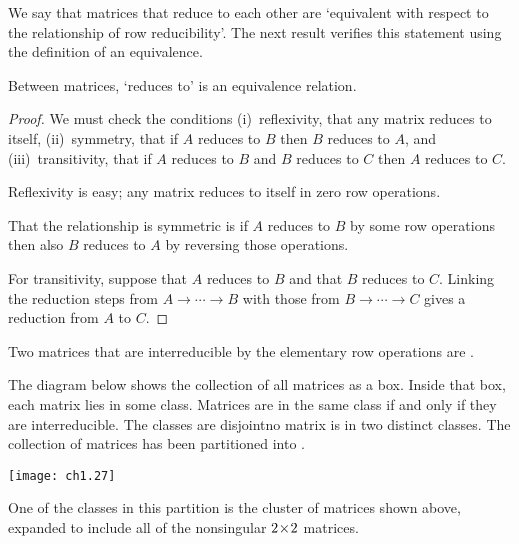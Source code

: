 We say 
that matrices that reduce to each other are `equivalent with respect
to the relationship of row reducibility'.
The next result verifies this statement using the definition of 
an equivalence.

\begin{lemma}
Between matrices, `reduces to' is an equivalence re\-la\-tion.
\end{lemma}

\begin{proof}
We must check the conditions
(i)~reflexivity, that any matrix reduces to itself,
(ii)~symmetry, that if \( A \) reduces to \( B \) then
   \( B \) reduces to \( A \),
and (iii)~transitivity, that if \( A \) reduces to \( B \) and
      \( B \) reduces to \( C \) then \( A \) reduces to
      \( C \).

Reflexivity is easy; any  matrix reduces to itself in zero row operations.

That the relationship is symmetric is \Dash if
\( A \) reduces to \( B \) by some row operations
then also \( B \) reduces to \( A \) by reversing those operations.

For transitivity, suppose that \( A \) reduces to \( B \) and
that \( B \) reduces to \( C \).
Linking the reduction steps from $A \rightarrow\cdots\rightarrow B$
with those from  $B \rightarrow\cdots\rightarrow C$ 
gives a reduction from \( A \) to \( C \).
\end{proof}

\begin{definition}
Two matrices that are interreducible by the elementary row operations
are .%
\end{definition}

The diagram below shows the collection of all matrices as a box.
Inside that box, each matrix lies in some class.
Matrices are in the same class if and only if they are interreducible.
The classes are disjoint\Dash no matrix is in two distinct classes.
The collection of matrices has been partitioned into 
.

\begin{center}
  \texttt{[image: ch1.27]}
\end{center}
\noindent One of the classes in this partition is the
cluster of matrices shown above,
expanded to include all of the nonsingular $2 \! \times \! 2$ matrices. 

